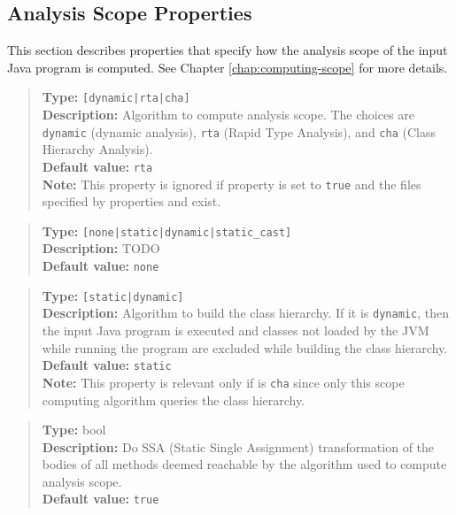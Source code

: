 \subsection{Analysis Scope Properties}
\label{sec:scope-props}

This section describes properties that specify how the analysis scope of the input Java program is computed.
See Chapter \ref{chap:computing-scope} for more details.
\\[10pt]

\begin{quote}
{\bf Type:} {\tt [dynamic|rta|cha]} \\
{\bf Description:} Algorithm to compute analysis scope.  The choices are {\tt dynamic} (dynamic analysis), {\tt rta} (Rapid Type Analysis), and {\tt cha} (Class Hierarchy Analysis). \\
{\bf Default value:} {\tt rta} \\
{\bf Note:} This property is ignored if property  is set to {\tt true} and the files specified by properties  and  exist. 
\end{quote}

\begin{quote}
{\bf Type:} {\tt [none|static|dynamic|static\_cast]} \\
{\bf Description:} TODO \\
{\bf Default value:} {\tt none}
\end{quote}

\begin{quote}
{\bf Type:} {\tt [static|dynamic]} \\
{\bf Description:} Algorithm to build the class hierarchy.  If it is {\tt dynamic}, then the input Java program is executed
and classes not loaded by the JVM while running the program are excluded while building the class hierarchy. \\
{\bf Default value:} {\tt static} \\
{\bf Note:} This property is relevant only if  is {\tt cha} since only this
scope computing algorithm queries the class hierarchy. 
\end{quote}

\begin{quote}
{\bf Type:} bool  \\
{\bf Description:} Do SSA (Static Single Assignment) transformation of the bodies of all methods deemed reachable by the algorithm used to compute analysis scope. \\
{\bf Default value:} {\tt true}
\end{quote}

